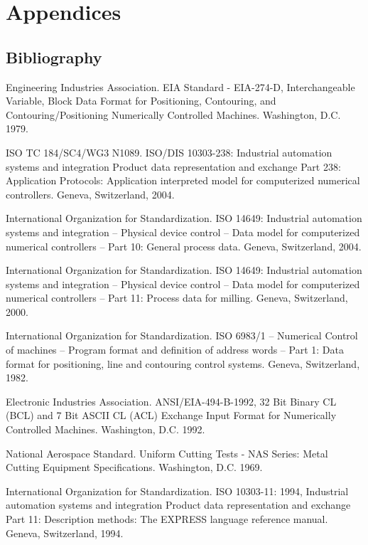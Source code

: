\appendix
\section*{Appendices}
\renewcommand{\thesubsection}{\Alph{subsection}}

\subsection{Bibliography}
\label{sec:Bibliography}

Engineering Industries Association. EIA Standard - EIA-274-D, Interchangeable Variable, Block Data Format for Positioning, Contouring, and Contouring/Positioning Numerically Controlled Machines. Washington, D.C. 1979.

ISO TC 184/SC4/WG3 N1089. ISO/DIS 10303-238: Industrial automation systems and integration  Product data representation and exchange  Part 238: Application Protocols: Application interpreted model for computerized numerical controllers. Geneva, Switzerland, 2004.

International Organization for Standardization. ISO 14649: Industrial automation systems and integration – Physical device control – Data model for computerized numerical controllers – Part 10: General process data. Geneva, Switzerland, 2004.

International Organization for Standardization. ISO 14649: Industrial automation systems and integration – Physical device control – Data model for computerized numerical controllers – Part 11: Process data for milling. Geneva, Switzerland, 2000.

International Organization for Standardization. ISO 6983/1 – Numerical Control of machines – Program format and definition of address words – Part 1: Data format for positioning, line and contouring control systems. Geneva, Switzerland, 1982.

Electronic Industries Association. ANSI/EIA-494-B-1992, 32 Bit Binary CL (BCL) and 7 Bit ASCII CL (ACL) Exchange Input Format for Numerically Controlled Machines. Washington, D.C. 1992.

National Aerospace Standard. Uniform Cutting Tests - NAS Series: Metal Cutting Equipment Specifications. Washington, D.C. 1969.

International Organization for Standardization. ISO 10303-11: 1994, Industrial automation systems and integration  Product data representation and exchange  Part 11: Description methods: The EXPRESS language reference manual. Geneva, Switzerland, 1994.

